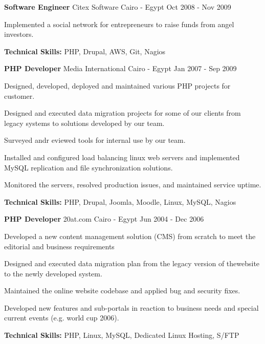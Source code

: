 \begin{cventries}
  \cventry
    {\textbf{Software Engineer}} %
    {Citex Software} %
    {Cairo - Egypt} %
    {Oct 2008 - Nov 2009} %
    {
      \begin{cvitems} %
        \item {Implemented a social network for entrepreneurs to raise funds from angel investors.}
        \item {\textbf{Technical Skills:} PHP, Drupal, AWS, Git, Nagios}
      \end{cvitems}
    }

  \cventry
    {\textbf{PHP Developer}} %
    {Media International} %
    {Cairo - Egypt} %
    {Jan 2007 - Sep 2009} %
    {
      \begin{cvitems} %
        \item {Designed, developed, deployed and maintained various PHP projects for customer.}
        \item {Designed and executed data migration projects for some of our clients from legacy
          systems to solutions developed by our team.}
        \item {Surveyed andr eviewed tools for internal use by our team.}
        \item {Installed and configured load balancing linux web servers and implemented MySQL
          replication and file synchronization solutions.}
        \item {Monitored the servers, resolved production issues, and maintained service uptime.}
        \item {\textbf{Technical Skills:} PHP, Drupal, Joomla, Moodle, Linux, MySQL, Nagios}
      \end{cvitems}
    }

  \cventry
    {\textbf{PHP Developer}} %
    {20at.com} %
    {Cairo - Egypt} %
    {Jun 2004 - Dec 2006} %
    {
      \begin{cvitems} %
        \item {Developed a new content management solution (CMS) from scratch to meet the editorial
          and business requirements}
        \item {Designed and executed data migration plan from the legacy version of thewebsite to
          the newly developed system.}
        \item {Maintained the online website codebase and applied bug and security fixes.}
        \item {Developed new features and sub-portals in reaction to business needs and special
          current events (e.g. world cup
2006).}
        \item {\textbf{Technical Skills:} PHP, Linux, MySQL, Dedicated Linux Hosting, S/FTP}
      \end{cvitems}
    }
\end{cventries}
